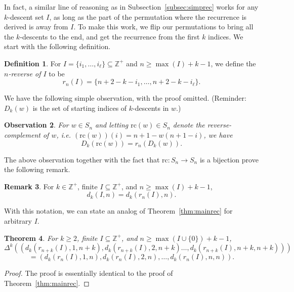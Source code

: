 \documentclass{amsart}
\newtheorem{theorem}{Theorem}[section]
\newtheorem{observation}[theorem]{Observation}
\theoremstyle{definition}
\newtheorem{remark}[theorem]{Remark}
\newtheorem{definition}[theorem]{Definition}
\begin{document}
In fact, a similar line of reasoning as in Subsection~\ref{subsec:simprec} works for any $k$-descent set $I$, as long as the part of the permutation where the recurrence is derived is away from $I$. To make this work, we flip our permutations to bring all the $k$-descents to the end, and get the recurrence from the first $k$ indices. We start with the following definition.

\begin{definition}
For $I=\{i_1,\ldots, i_\ell\}\subseteq \mathbb{Z}^+$ and $n\geq \max(I)+k-1$, we define the \emph{$n$-reverse of $I$} to be
\[r_n(I)=\{n+2-k-i_1,\ldots, n+2-k-i_\ell\}.\]
\end{definition}

We have the following simple observation, with the proof omitted. (Reminder: $D_k(w)$ is the set of starting indices of $k$-descents in $w$.)

\begin{observation}
For $w\in S_n$ and letting $\mathrm{rc}(w)\in S_n$ denote the reverse-complement of $w$, i.e. $\left(\mathrm{rc}(w)\right)(i)=n+1-w(n+1-i)$, we have
\[D_k(\mathrm{rc}(w))=r_n(D_k(w)).\]
\end{observation} 


The above observation together with the fact that $\mathrm{rc}\colon S_n\to S_n$ is a bijection prove the following remark.
\begin{remark}\label{rmk:bij}
For $k\in \mathbb{Z}^+$, finite $I\subseteq \mathbb{Z}^+$, and $n\geq \max(I)+k-1$,
\[d_k(I,n)=d_k(r_n(I),n).\]
\end{remark}

With this notation, we can state an analog of Theorem~\ref{thm:mainrec} for arbitrary $I$. 

\begin{theorem}\label{thm:otherrec}
For $k\geq 2$, finite $I\subseteq \mathbb{Z}^+$, and $n\geq \max(I\cup \{0\})+k-1$,
\[\Delta^k\left(\left(d_k(r_{n+k}(I),1,n+k),d_k(r_{n+k}(I),2,n+k)\ldots, d_k(r_{n+k}(I),n+k,n+k)\right)\right)\]\[=\left(d_k(r_n(I),1,n),d_k(r_n(I),2,n),\ldots,d_k(r_n(I),n,n)\right).\]
\end{theorem}

\begin{proof}
The proof is essentially identical to the proof of Theorem~\ref{thm:mainrec}.
\end{proof}
\end{document}
